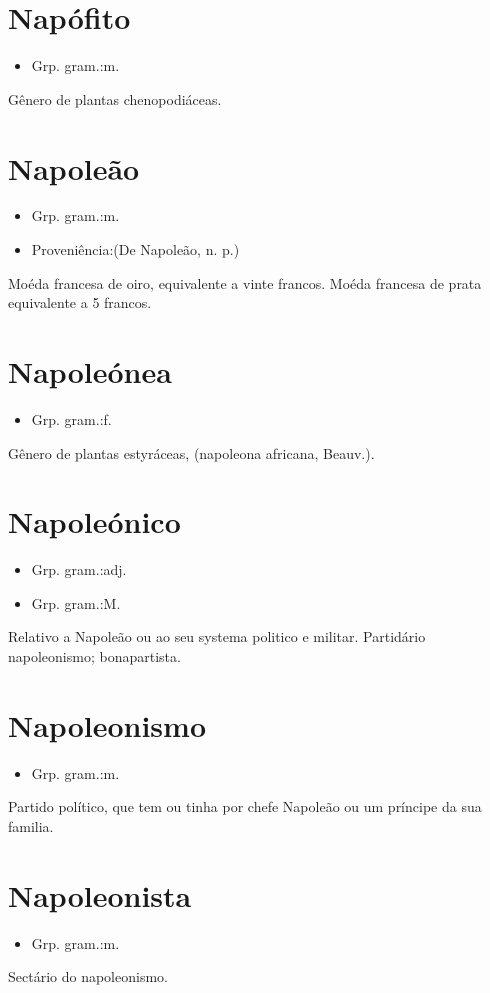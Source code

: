 \section{Napófito}
\begin{itemize}
\item {Grp. gram.:m.}
\end{itemize}
Gênero de plantas chenopodiáceas.
\section{Napoleão}
\begin{itemize}
\item {Grp. gram.:m.}
\end{itemize}
\begin{itemize}
\item {Proveniência:(De \textunderscore Napoleão\textunderscore , n. p.)}
\end{itemize}
Moéda francesa de oiro, equivalente a vinte francos.
Moéda francesa de prata equivalente a 5 francos.
\section{Napoleónea}
\begin{itemize}
\item {Grp. gram.:f.}
\end{itemize}
Gênero de plantas estyráceas, (\textunderscore napoleona africana\textunderscore , Beauv.).
\section{Napoleónico}
\begin{itemize}
\item {Grp. gram.:adj.}
\end{itemize}
\begin{itemize}
\item {Grp. gram.:M.}
\end{itemize}
Relativo a Napoleão ou ao seu systema politico e militar.
Partidário napoleonismo; bonapartista.
\section{Napoleonismo}
\begin{itemize}
\item {Grp. gram.:m.}
\end{itemize}
Partido político, que tem ou tinha por chefe Napoleão ou um príncipe da sua familia.
\section{Napoleonista}
\begin{itemize}
\item {Grp. gram.:m.}
\end{itemize}
Sectário do napoleonismo.
